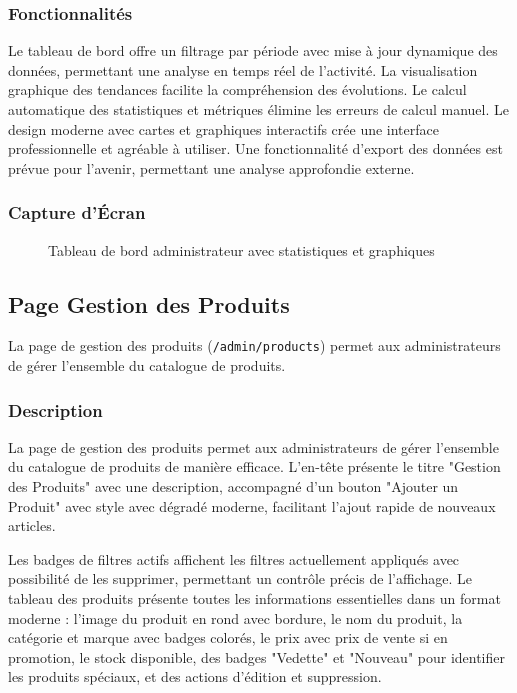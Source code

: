 \documentclass[12pt,a4paper]{article}
\begin{document}
\subsubsection{Fonctionnalités}

Le tableau de bord offre un filtrage par période avec mise à jour dynamique des données, permettant une analyse en temps réel de l'activité. La visualisation graphique des tendances facilite la compréhension des évolutions. Le calcul automatique des statistiques et métriques élimine les erreurs de calcul manuel. Le design moderne avec cartes et graphiques interactifs crée une interface professionnelle et agréable à utiliser. Une fonctionnalité d'export des données est prévue pour l'avenir, permettant une analyse approfondie externe.

\subsubsection{Capture d'Écran}

\begin{figure}[H]
    \centering
    \caption{Tableau de bord administrateur avec statistiques et graphiques}
    \label{fig:admin-dashboard}
\end{figure}

\subsection{Page Gestion des Produits}

La page de gestion des produits (\texttt{/admin/products}) permet aux administrateurs de gérer l'ensemble du catalogue de produits.

\subsubsection{Description}

La page de gestion des produits permet aux administrateurs de gérer l'ensemble du catalogue de produits de manière efficace. L'en-tête présente le titre "Gestion des Produits" avec une description, accompagné d'un bouton "Ajouter un Produit" avec style avec dégradé moderne, facilitant l'ajout rapide de nouveaux articles.

Les badges de filtres actifs affichent les filtres actuellement appliqués avec possibilité de les supprimer, permettant un contrôle précis de l'affichage. Le tableau des produits présente toutes les informations essentielles dans un format moderne : l'image du produit en rond avec bordure, le nom du produit, la catégorie et marque avec badges colorés, le prix avec prix de vente si en promotion, le stock disponible, des badges "Vedette" et "Nouveau" pour identifier les produits spéciaux, et des actions d'édition et suppression.
\end{document}
